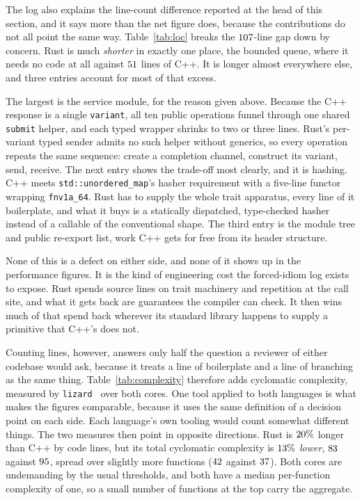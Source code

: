 \documentclass[english,oneside,a4paper,censored,csm,software-track-2020]{HYthesisML}
\begin{document}
The log also explains the line-count difference reported at the head of this section, and it
says more than the net figure does, because the contributions do not all point
the same way. Table~\ref{tab:loc} breaks the $107$-line gap down by concern. Rust is
much \emph{shorter} in exactly one place, the bounded queue, where it needs no code
at all against $51$ lines of C++. It is longer almost everywhere else, and
three entries account for most of that excess.

The largest is the service module, for the reason given above. Because the C++ response is a
single \texttt{variant}, all ten public operations funnel through one shared \texttt{submit}
helper, and each typed wrapper shrinks to two or three lines. Rust's per-variant typed
sender admits no such helper without generics, so every operation repeats the same sequence:
create a completion channel, construct its variant, send, receive. The next entry shows the
trade-off most clearly, and it is hashing. C++ meets
\texttt{std::unordered\_map}'s hasher requirement with a five-line functor wrapping
\texttt{fnv1a\_64}. Rust has to supply the whole trait apparatus, every line of it
boilerplate, and what it buys is a statically dispatched, type-checked hasher instead of a
callable of the conventional shape. The third entry is the module tree and public re-export
list, work C++ gets for free from its header structure.

None of this is a defect on either side, and none of it shows up in the performance figures.
It is the kind of engineering cost the forced-idiom log exists to expose. Rust spends source
lines on trait machinery and repetition at the call site, and what it gets back are guarantees
the compiler can check. It then wins much of that spend back wherever its standard library
happens to supply a primitive that C++'s does not.

Counting lines, however, answers only half the question a reviewer of either codebase would
ask, because it treats a line of boilerplate and a line of branching as the same thing.
Table~\ref{tab:complexity} therefore adds cyclomatic complexity, measured by
\texttt{lizard}~\cite{lizard} over both cores. One tool applied to both languages is what makes
the figures comparable, because it uses the same definition of a decision point on each side.
Each language's own tooling would count somewhat different things. The two measures then
point in opposite directions. Rust is $20\%$ longer than C++ by code lines, but its
total cyclomatic complexity is $13\%$ \emph{lower}, $83$ against
$95$, spread over slightly more functions ($42$ against $37$). Both
cores are undemanding by the usual thresholds, and both have a median per-function complexity
of one, so a small number of functions at the top carry the aggregate.
\end{document}
